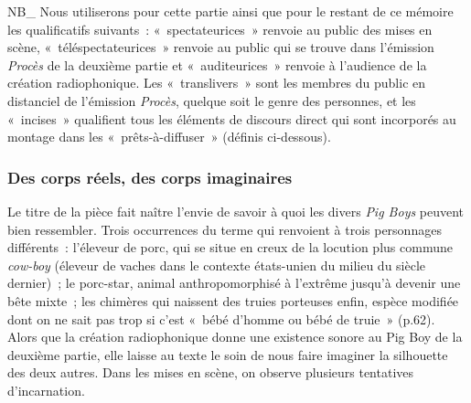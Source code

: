 \documentclass[
]{article}
\begin{document}
NB\_ Nous utiliserons pour cette partie ainsi que pour le restant de ce mémoire les qualificatifs suivants~: «~spectateurices~» renvoie au public des mises en scène, «~téléspectateurices~» renvoie au public qui se trouve dans l'émission \emph{Procès} de la deuxième partie et «~auditeurices~» renvoie à l'audience de la création radiophonique. Les «~translivers~» sont les membres du public en distanciel de l'émission \emph{Procès}, quelque soit le genre des personnes, et les «~incises~» qualifient tous les éléments de discours direct qui sont incorporés au montage dans les «~prêts-à-diffuser~» (définis ci-dessous).

\subsubsection{Des corps réels, des corps imaginaires}\label{des-corps-ruxe9els-des-corps-imaginaires}

Le titre de la pièce fait naître l'envie de savoir à quoi les divers \emph{Pig Boys} peuvent bien ressembler. Trois occurrences du terme qui renvoient à trois personnages différents~: l'éleveur de porc, qui se situe en creux de la locution plus commune \emph{cow-boy} (éleveur de vaches dans le contexte états-unien du milieu du siècle dernier)~; le porc-star, animal anthropomorphisé à l'extrême jusqu'à devenir une bête mixte~; les chimères qui naissent des truies porteuses enfin, espèce modifiée dont on ne sait pas trop si c'est «~bébé d'homme ou bébé de truie~» (p.62). Alors que la création radiophonique donne une existence sonore au Pig Boy de la deuxième partie, elle laisse au texte le soin de nous faire imaginer la silhouette des deux autres. Dans les mises en scène, on observe plusieurs tentatives d'incarnation.
\end{document}
